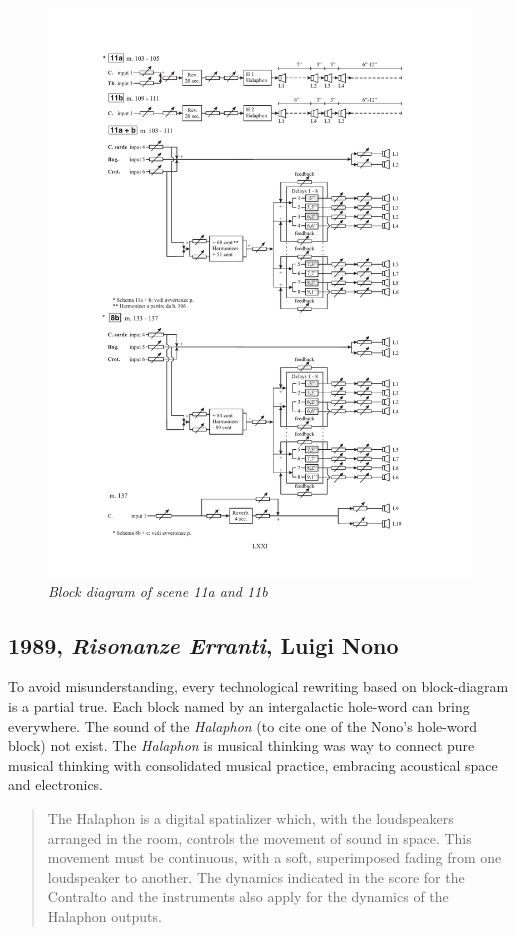 \documentclass[twoside,a4paper]{article}
\begin{document}

\begin{figure}[ht]
\centerline{\includegraphics[width=.45\textwidth]{img/re-diagramma11}}
\caption{\label{re-dia-6c}{\it Block diagram of scene 11a and 11b}}
\end{figure}

\subsection{1989, \emph{Risonanze Erranti}, Luigi Nono}

To avoid misunderstanding, every technological rewriting based on block-diagram is a partial true. Each block named by an intergalactic hole-word can bring everywhere. The sound of the \emph{Halaphon} (to cite one of the Nono's hole-word block) not exist. The \emph{Halaphon} is musical thinking was way to connect pure musical thinking with consolidated musical practice, embracing acoustical space and electronics. 

\begin{quote}
The Halaphon is a digital spatializer which, with the loudspeakers arranged in the room, controls the movement of sound in space. This movement must be continuous, with a soft, superimposed fading from one loudspeaker to another. The dynamics indicated in the score for the Contralto and the instruments also apply for the dynamics of the Halaphon outputs. %
\end{quote}
\end{document}
